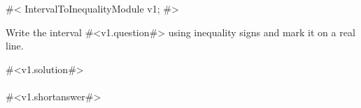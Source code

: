 

#<
IntervalToInequalityModule v1;
#>


Write the interval #<v1.question#> using inequality signs and mark it on a real line.


#<v1.solution#>
\\
\\


#<v1.shortanswer#>
\\



